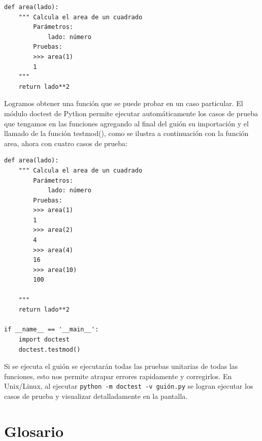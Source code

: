 \beforeverb
\begin{verbatim}
def area(lado):
    """ Calcula el area de un cuadrado
        Parámetros:
            lado: número
        Pruebas:
        >>> area(1)
        1        
    """
    return lado**2
\end{verbatim}
\afterverb

Logramos obtener una función que se puede probar en un caso particular. El 
módulo doctest de Python permite ejecutar automáticamente los casos de 
prueba que tengamos en las funciones agregando al final del guión
su importación y el llamado de la función testmod(), como se ilustra a
continuación con la función area, ahora con cuatro casos de prueba:

\beforeverb
\begin{verbatim}
def area(lado):
    """ Calcula el area de un cuadrado
        Parámetros:
            lado: número
        Pruebas:
        >>> area(1)
        1
        >>> area(2)
        4
        >>> area(4)
        16
        >>> area(10)
        100
        
    """
    return lado**2

if __name__ == '__main__':
    import doctest
    doctest.testmod()
\end{verbatim}
\afterverb

Si se ejecuta el guión se ejecutarán todas las pruebas unitarias de todas
las funciones, esto nos permite atrapar errores rapidamente y corregirlos. 
En Unix/Linux, al ejecutar \verb+python -m doctest -v guión.py+ se logran 
ejecutar los casos de prueba y visualizar detalladamente en la pantalla.

\section{Glosario}

